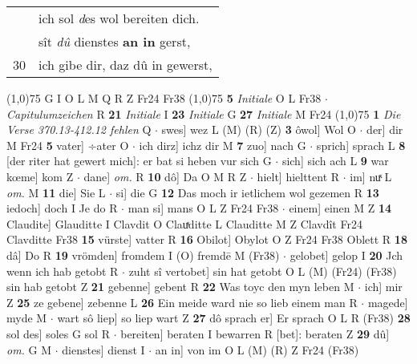 \documentclass[8pt,a4paper,notitlepage]{article}
\begin{document}
\begin{table}[ht]
\begin{minipage}[t]{0.5\linewidth}
\begin{tabular}{rl}
 & ich sol \textit{d}es wol bereiten dich.\\ 
 & sît \textit{dû} dienstes \textbf{an in} gerst,\\ 
30 & ich gibe dir, daz dû in gewerst,\\ 
\end{tabular}
\scriptsize
\line(1,0){75} \newline
G I O L M Q R Z Fr24 Fr38 \newline
\line(1,0){75} \newline
\textbf{5} \textit{Initiale} O L Fr38   $\cdot$ \textit{Capitulumzeichen} R  \textbf{21} \textit{Initiale} I  \textbf{23} \textit{Initiale} G  \textbf{27} \textit{Initiale} M Fr24  \newline
\line(1,0){75} \newline
\textbf{1} \textit{Die Verse 370.13-412.12 fehlen} Q   $\cdot$ swes] wez L (M) (R) (Z) \textbf{3} ôwol] Wol O  $\cdot$ der] dir M Fr24 \textbf{5} vater] ÷ater O  $\cdot$ ich dirz] ichz dir M \textbf{7} zuo] nach G  $\cdot$ sprich] sprach L \textbf{8} [der riter hat gewert mich]: er bat si heben vur sich G  $\cdot$ sich] sich ach L \textbf{9} war kœme] kom Z  $\cdot$ dane] \textit{om.} R \textbf{10} dô] Da O M R Z  $\cdot$ hielt] hielttent R  $\cdot$ im] nuͯ L \textit{om.} M \textbf{11} die] Sie L  $\cdot$ si] die G \textbf{12} Das moch ir ietlichem wol gezemen R \textbf{13} iedoch] doch I Je do R  $\cdot$ man si] mans O L Z Fr24 Fr38  $\cdot$ einem] einen M Z \textbf{14} Claudite] Glauditte I Clavdit O Clauͯditte L Clauditte M Z Clavdît Fr24 Clavditte Fr38 \textbf{15} vürste] vatter R \textbf{16} Obilot] Obylot O Z Fr24 Fr38 Oblett R \textbf{18} dâ] Do R \textbf{19} vrömden] fromdem I (O) fremdē M (Fr38)  $\cdot$ gelobet] gelop I \textbf{20} Jch wenn ich hab getobt R  $\cdot$ zuht sî vertobet] sin hat getobt O L (M) (Fr24) (Fr38) sin hab getobt Z \textbf{21} gebenne] gebent R \textbf{22} Was toyc den myn leben M  $\cdot$ ich] mir Z \textbf{25} ze gebene] zebenne L \textbf{26} Ein meide ward nie so lieb einem man R  $\cdot$ magede] myde M  $\cdot$ wart sô liep] so liep wart Z \textbf{27} dô sprach er] Er sprach O L R (Fr38) \textbf{28} sol des] soles G sol R  $\cdot$ bereiten] beraten I bewarren R [bet]: beraten Z \textbf{29} dû] \textit{om.} G M  $\cdot$ dienstes] dienst I  $\cdot$ an in] von im O L (M) (R) Z Fr24 (Fr38) \newline
\end{minipage}
\hspace{0.5cm}
\begin{minipage}[t]{0.5\linewidth}

\end{minipage}
\end{table}
\end{document}
